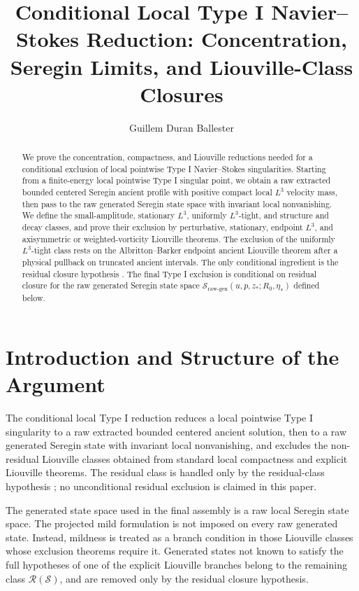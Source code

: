\documentclass[11pt]{amsart}
\title[Conditional Local Type I Navier--Stokes Reduction]
{Conditional Local Type I Navier--Stokes Reduction: Concentration, Seregin Limits, and Liouville-Class Closures}
\author{Guillem Duran Ballester}
\date{}
\theoremstyle{plain}
\theoremstyle{definition}
\theoremstyle{remark}
\numberwithin{equation}{section}
\newcommand{\calS}{\mathcal S}
\newcommand{\calR}{\mathcal R}
\begin{document}
\begin{abstract}
We prove the concentration, compactness, and Liouville reductions needed for a
conditional exclusion of local pointwise Type I Navier--Stokes singularities.
Starting from a finite-energy local pointwise Type I singular
point, we obtain a raw extracted bounded centered Seregin ancient profile
with positive compact local \(L^3\) velocity mass, then pass to the raw
generated Seregin state space with invariant local nonvanishing.  We define the
small-amplitude, stationary \(L^3\), uniformly \(L^3\)-tight, and
structure and decay classes, and prove their exclusion by
perturbative, stationary, endpoint \(L^3\), and axisymmetric or
weighted-vorticity Liouville theorems.  The exclusion of the uniformly
\(L^3\)-tight class
rests on the Albritton--Barker endpoint ancient Liouville theorem after a
physical pullback on truncated ancient intervals.  The only conditional
ingredient is the residual closure hypothesis .
The final Type I exclusion is conditional on residual closure for the
raw generated Seregin state space
\(\calS_{\mathrm{raw\text{-}gen}}(u,p,z_*;R_0,\eta_*)\) defined below.
\end{abstract}

\maketitle
\tableofcontents

\section*{Introduction and Structure of the Argument}

The conditional local Type I reduction reduces a local
pointwise Type I singularity to a raw extracted bounded centered ancient
solution, then to a raw generated Seregin state with invariant local
nonvanishing, and excludes the non-residual Liouville classes obtained from
standard local compactness and explicit Liouville theorems.  The residual
class is handled only by the residual-class hypothesis
; no unconditional residual exclusion is claimed in
this paper.

The generated state space used in the final assembly is a raw local Seregin
state space.  The projected mild formulation is not imposed on every raw
generated state.  Instead, mildness is treated as a branch condition in those
Liouville classes whose exclusion theorems require it.  Generated states not
known to satisfy the full hypotheses of one of the explicit Liouville branches
belong to the remaining class \(\calR(\calS)\), and are removed only by the
residual closure hypothesis.
\end{document}
